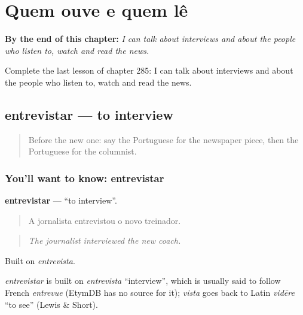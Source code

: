 
\chapter{Quem ouve e quem lê}
\label{ch:pt-quem-ouve-e-quem-le}

\begin{chapteropening}
\textbf{By the end of this chapter:} \emph{I can talk about interviews and about the people who listen to, watch and read the news.}

Complete the last lesson of chapter 285: I can talk about interviews and about the people who listen to, watch and read the news.
\end{chapteropening}

\section[entrevistar]{entrevistar — to interview}

\label{lesson:PT-C285-entrevistar}



\begin{quote}
Before the new one: say the Portuguese for the newspaper piece, then the Portuguese for the columnist.
\end{quote}

\subsection*{You'll want to know: entrevistar}
\textbf{entrevistar} — \textquotedblleft{}to interview\textquotedblright{}.

\begin{quote}
A jornalista entrevistou o novo treinador.
\end{quote}

\begin{quote}
\emph{The journalist interviewed the new coach.}
\end{quote}

Built on \emph{entrevista}.

\begin{cousinweb}
\emph{entrevistar} is built on \emph{entrevista} \textquotedblleft{}interview\textquotedblright{}, which is usually said to follow French \emph{entrevue} (EtymDB has no source for it); \emph{vista} goes back to Latin \emph{vidēre} \textquotedblleft{}to see\textquotedblright{} (Lewis \& Short).
\end{cousinweb}

